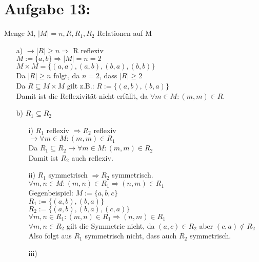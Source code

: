 \documentclass[paper = a4, ngerman]{scrartcl}
\begin{document}
\section*{Aufgabe 13:}

Menge M, $|M| = n, R, R_1, R_2 $ Relationen auf M\\

\begin{itemize}
	\item[a)]
		$\rightarrow |R| \ge n \Rightarrow $ R reflexiv\\
		$M := \{a,b\} \Rightarrow |M| = n = 2$\\
		$M \times M = \{(a,a),(a,b),(b,a),(b,b)\}$\\
		Da $|R| \ge n$ folgt, da $n = 2$, dass $|R| \ge 2$\\
		Da $R \subseteq M \times M$ gilt z.B.: $R := \{(a,b),(b,a)\}$\\
		Damit ist die Reflexivität nicht erfüllt, da $\forall m \in M : (m,m) \in R$.\\
	\item[b)]
		$R_1 \subseteq R_2$
		\begin{itemize}
			\item[i)]
				$R_1$ reflexiv $\Rightarrow R_2 $ reflexiv\\
				$\rightarrow \forall m \in M : (m,m) \in R_1$\\ Da $R_1 \subseteq R_2 \rightarrow \forall m \in M : (m,m) \in R_2$\\ Damit ist $R_2$ auch reflexiv.
			\item[ii)]
				$R_1 $ symmetrisch $\Rightarrow R_2 $ symmetrisch.\\
				$\forall m,n \in M : (m,n) \in R_1 \Rightarrow (n,m) \in R_1$\\
				Gegenbeispiel: $M := \{a,b,c\}$\\
				$R_1 := \{(a,b),(b,a)\}$\\
				$R_2 := \{(a,b),(b,a),(c,a)\}$\\
				$\forall m,n \in R_1 : (m,n) \in R_1 \Rightarrow (n,m) \in R_1$\\
				$\forall m,n \in R_2 $ gilt die Symmetrie nicht, da $(a,c) \in R_2$ aber $(c,a) \notin R_2 $\\
				
				Also folgt aus 	$R_1 $ symmetrisch nicht, dass auch $R_2$ symmetrisch.
				\item[iii)]
		\end{itemize}
\end{itemize}
\end{document}
